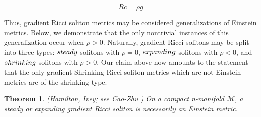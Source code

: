 \documentclass[openany, amssymb, psamsfonts]{amsart}
\newtheorem{thm}{Theorem}[section]
\theoremstyle{definition}
\numberwithin{equation}{section}
\begin{document}
$$Rc = \rho g$$

Thus, gradient Ricci soliton metrics may be considered generalizations of Einstein metrics. Below, we demonstrate that the only nontrivial instances of this generalization occur when $\rho > 0$. Naturally, gradient Ricci solitons may be split into three types: $\emph{steady}$ solitons with $\rho = 0$, $\emph{expanding}$ solitons with $\rho < 0$, and $\emph{shrinking}$ solitons with $\rho > 0$. Our claim above now amounts to the statement that the only gradient Shrinking Ricci soliton metrics which are not Einstein metrics are of the shrinking type.

\begin{thm} (Hamilton, Ivey; see Cao-Zhu \cite{caoOne}) On a compact n-manifold $\mathcal{M}$, a steady or expanding gradient Ricci soliton is necessarily an Einstein metric. 

\end{thm}
\end{document}
